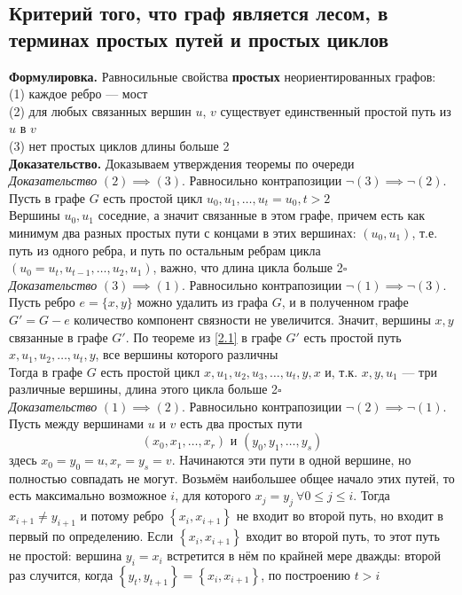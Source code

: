 \documentclass[a4paper]{article}
\begin{document}
\subsection{Критерий того, что граф является лесом, в терминах простых путей и простых циклов}
\textbf{Формулировка.} Равносильные свойства \textbf{простых} неориентированных графов:\\[2mm]
\indent\indent(1) каждое ребро — мост\\[2mm]
\indent\indent(2) для любых связанных вершин $u$, $v$ существует единственный простой путь из $u$ в $v$\\[2mm]
\indent\indent(3) нет простых циклов длины больше 2\\[2mm]
\indent\textbf{Доказательство.} Доказываем утверждения теоремы по очереди\\[2mm]
\textit{Доказательство} $(2)\implies(3)$. Равносильно контрапозиции $\neg(3)\implies\neg(2)$. Пусть в графе $G$ есть простой цикл $u_0, u_1,\ldots,u_t=u_0,t>2$\\[2mm]
\indent Вершины $u_0,u_1$ соседние, а значит связанные в этом графе, причем есть как минимум два разных простых пути с концами в этих вершинах: $(u_0,u_1)$, т.е. путь из одного ребра, и путь по остальным ребрам цикла $(u_0=u_t,u_{t-1},\ldots,u_2,u_1)$, важно, что длина цикла больше 2\hfill$\square$\\[3mm]
\textit{Доказательство} $(3)\implies(1)$. Равносильно контрапозиции $\neg(1)\implies\neg(3)$. Пусть ребро $e=\{x,y\}$ можно удалить из графа $G$, и в полученном графе $G'=G-e$ количество компонент связности не увеличится. Значит, вершины $x,y$ связанные в графе $G'$. По теореме из \ref{2.1} в графе $G'$ есть простой путь $x,u_1,u_2,\ldots,u_t,y$, все вершины которого различны\\[2mm]
\indent Тогда в графе $G$ есть простой цикл $x,u_1,u_2,u_3,\ldots,u_t,y,x$ и, т.к. $x,y,u_1$ — три различные вершины, длина этого цикла больше 2\hfill$\square$\\[3mm]
\textit{Доказательство} $(1)\implies(2)$. Равносильно контрапозиции $\neg(2)\implies\neg(1)$. Пусть между вершинами $u$ и $v$ есть два простых пути $$(x_0,x_1,\ldots,x_r)\textrm{ и }(y_0,y_1,\ldots,y_s)$$
здесь $x_0=y_0=u,x_r=y_s=v$. Начинаются эти пути в одной вершине, но полностью совпадать не могут. Возьмём наибольшее общее начало этих путей, то есть максимально возможное $i$, для которого $x_j=y_j\ \forall0 \leqslant j \leqslant i$. Тогда $x_{i+1} \neq y_{i+1}$ и потому ребро $\left\{x_i, x_{i+1}\right\}$ не входит во второй путь, но входит в первый по определению. Если $\left\{x_i, x_{i+1}\right\}$ входит во второй путь, то этот путь не простой: вершина $y_i=x_i$ встретится в нём по крайней мере дважды: второй раз случится, когда $\left\{y_t, y_{t+1}\right\}=\left\{x_i, x_{i+1}\right\}$, по построению $t>i$\\[2mm]
\end{document}
